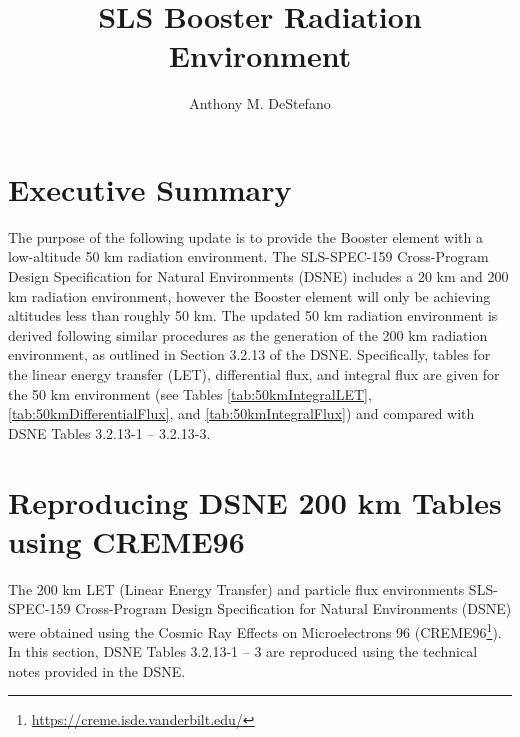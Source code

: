 \documentclass{hitec}
\title{SLS Booster Radiation Environment}
\author{Anthony M. DeStefano}
\begin{document}
\maketitle
{}

\tableofcontents
\listoffigures
\listoftables
\lstlistoflistings
\newpage






\cleardoublepage
{}
\section{Executive Summary}


The purpose of the following update is to provide the Booster element with
a low-altitude 50 km radiation environment. The SLS-SPEC-159 Cross-Program Design Specification for Natural Environments (DSNE) includes a 20 km and 200 km radiation environment, however the Booster element will only be achieving altitudes less than roughly 50 km. The updated 50 km radiation environment is derived following similar procedures as the generation of the 200 km radiation environment, as outlined in Section 3.2.13 of the DSNE. Specifically, tables for the linear energy transfer (LET), differential flux, and integral flux are given for the 50 km environment (see Tables \ref{tab:50kmIntegralLET}, \ref{tab:50kmDifferentialFlux}, and \ref{tab:50kmIntegralFlux}) and compared with DSNE Tables 3.2.13-1 -- 3.2.13-3.


\newpage
\section{Reproducing DSNE 200 km Tables using CREME96}

The 200 km LET (Linear Energy Transfer) and particle flux environments SLS-SPEC-159 Cross-Program Design Specification for Natural Environments (DSNE) were obtained using the Cosmic Ray Effects on Microelectrons 96 (CREME96\footnote{\url{https://creme.isde.vanderbilt.edu/}}). In this section, DSNE Tables 3.2.13-1 -- 3 are reproduced using the technical notes provided in the DSNE.
\end{document}
